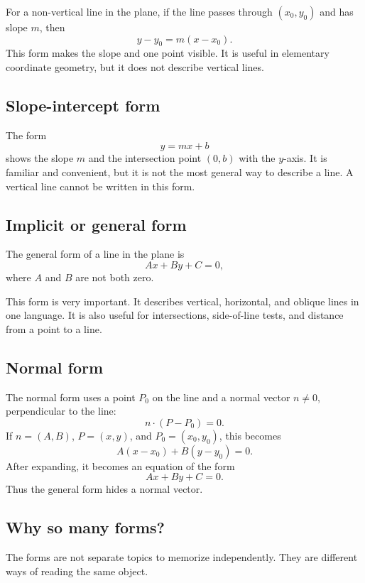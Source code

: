 For a non-vertical line in the plane, if the line passes through \((x_0,y_0)\) and has slope \(m\), then
\[
y-y_0=m(x-x_0).
\]
This form makes the slope and one point visible. It is useful in elementary coordinate geometry, but it does not describe vertical lines.

\subsection*{Slope-intercept form}

The form
\[
y=mx+b
\]
shows the slope \(m\) and the intersection point \((0,b)\) with the \(y\)-axis. It is familiar and convenient, but it is not the most general way to describe a line. A vertical line cannot be written in this form.

\subsection*{Implicit or general form}

The general form of a line in the plane is
\[
Ax+By+C=0,
\]
where \(A\) and \(B\) are not both zero.

This form is very important. It describes vertical, horizontal, and oblique lines in one language. It is also useful for intersections, side-of-line tests, and distance from a point to a line.

\subsection*{Normal form}

The normal form uses a point \(P_0\) on the line and a normal vector \(n\ne0\), perpendicular to the line:
\[
n\cdot(P-P_0)=0.
\]
If \(n=(A,B)\), \(P=(x,y)\), and \(P_0=(x_0,y_0)\), this becomes
\[
A(x-x_0)+B(y-y_0)=0.
\]
After expanding, it becomes an equation of the form
\[
Ax+By+C=0.
\]
Thus the general form hides a normal vector.

\subsection*{Why so many forms?}

The forms are not separate topics to memorize independently. They are different ways of reading the same object.

